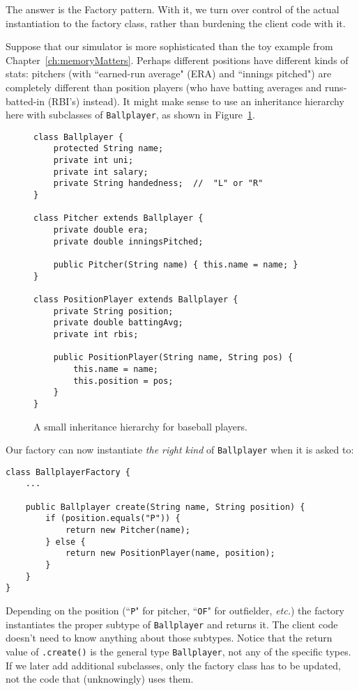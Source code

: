 The answer is the Factory pattern. With it, we turn over control of the actual
instantiation to the factory class, rather than burdening the client code with
it.

Suppose that our simulator is more sophisticated than the toy example from
Chapter~\ref{ch:memoryMatters}. Perhaps different positions have different
kinds of stats: pitchers (with ``earned-run average" (ERA) and ``innings
pitched") are completely different than position players (who have batting
averages and runs-batted-in (RBI's) instead). It might make sense to use an
inheritance hierarchy here with subclasses of \texttt{Ballplayer}, as shown in
Figure~\ref{ballplayerInheritance}.

\begin{figure}[ht]
\begin{Verbatim}[fontsize=\small,samepage=true,frame=single]
class Ballplayer {
    protected String name;
    private int uni;
    private int salary;
    private String handedness;  //  "L" or "R"
}

class Pitcher extends Ballplayer {
    private double era;
    private double inningsPitched;

    public Pitcher(String name) { this.name = name; }
}

class PositionPlayer extends Ballplayer {
    private String position;
    private double battingAvg;
    private int rbis;

    public PositionPlayer(String name, String pos) {
        this.name = name;
        this.position = pos;
    }
}
\end{Verbatim}
\caption{A small inheritance hierarchy for baseball players.}
\label{ballplayerInheritance}
\end{figure}

Our factory can now instantiate \textit{the right kind} of \texttt{Ballplayer}
when it is asked to:

\begin{Verbatim}[fontsize=\small,samepage=true,frame=single]
class BallplayerFactory {
    ...

    public Ballplayer create(String name, String position) {
        if (position.equals("P")) {
            return new Pitcher(name);
        } else {
            return new PositionPlayer(name, position);
        }
    }
}
\end{Verbatim}

Depending on the position (``\texttt{P}" for pitcher, ``\texttt{OF}" for
outfielder, \textit{etc.}) the factory instantiates the proper subtype of
\texttt{Ballplayer} and returns it. The client code doesn't need to know
anything about those subtypes. Notice that the return value of
\texttt{.create()} is the general type \texttt{Ballplayer}, not any of the
specific types. If we later add additional subclasses, only the factory class
has to be updated, not the code that (unknowingly) uses them.

